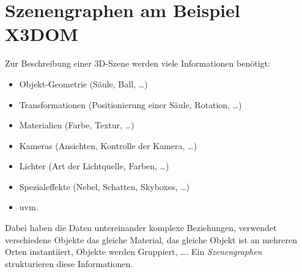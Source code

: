 \chapter{Szenengraphen am Beispiel X3DOM}
	Zur Beschreibung einer 3D-Szene werden viele Informationen benötigt:
	\begin{itemize}
		\item Objekt-Geometrie (Säule, Ball, \dots)
		\item Transformationen (Positionierung einer Säule, Rotation, \dots)
		\item Materialien (Farbe, Textur, \dots)
		\item Kameras (Ansichten, Kontrolle der Kamera, \dots)
		\item Lichter (Art der Lichtquelle, Farben, \dots)
		\item Spezialeffekte (Nebel, Schatten, Skyboxes, \dots)
		\item uvm.
	\end{itemize}
	Dabei haben die Daten untereinander komplexe Beziehungen, \zB verwendet verschiedene Objekte das gleiche Material, das gleiche Objekt ist an mehreren Orten instantiiert, Objekte werden Gruppiert, \dots. Ein \emph{Szenengraphen} strukturieren diese Informationen.
	
